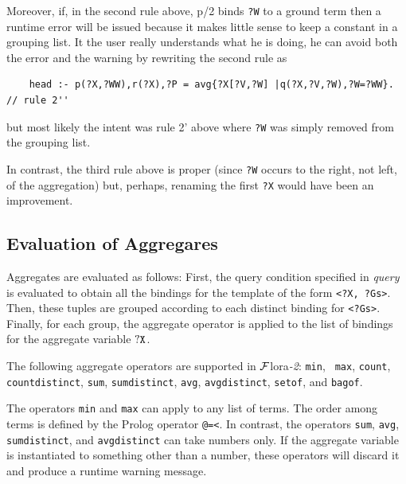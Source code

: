 \documentclass[11pt]{article}
\newcommand{\FLORA}{{\mbox{\sc ${\cal F}${lora}\rm\emph{-2}}}\xspace}
\newcommand{\FLSYSTEM}{\FLORA}
\begin{document}
Moreover, if, in the second rule above, p/2 binds \texttt{?W} to a ground term
then a runtime error will be issued because it makes little sense to
keep a constant in a grouping list. It the user really understands what he
is doing, he can avoid both the error and the warning by rewriting the
second rule as
\begin{verbatim}
    head :- p(?X,?WW),r(?X),?P = avg{?X[?V,?W] |q(?X,?V,?W),?W=?WW}. // rule 2''
\end{verbatim}
but most likely the intent was rule 2' above where \texttt{?W} was simply
removed from the grouping list. 

In contrast, the third rule above is proper (since \texttt{?W} occurs to
the right, not left, of the aggregation)
but, perhaps, renaming the first \texttt{?X} would have been an
improvement.

\subsection{Evaluation of Aggregares}\label{sec-aggr-eval}

Aggregates are evaluated as follows: First, the query
condition specified in {\it query} is evaluated to obtain all the bindings
for the template of the form {\tt \texttt{<}?X, ?Gs\texttt{>}}. Then, these
tuples are grouped according to each distinct binding for
{\tt \texttt{<}?Gs\texttt{>}}. Finally, for each group, the aggregate operator
is applied to the list of bindings for the aggregate variable $\tt ?X$.


%
The following aggregate operators are supported in \FLSYSTEM: {\tt min}, {\tt
  max}, {\tt count}, \texttt{countdistinct},
{\tt sum}, \texttt{sumdistinct},  {\tt avg}, \texttt{avgdistinct},
{\tt setof}, and {\tt bagof}. 

The operators {\tt min} and {\tt max} can apply to any list of
terms. The order among terms is defined by the Prolog operator {\tt @=<}.  In
contrast, the operators {\tt sum}, {\tt avg}, \texttt{sumdistinct}, and
\texttt{avgdistinct} 
can take numbers only. If
the aggregate variable is instantiated to something other than a
number, these operators will discard it and produce a runtime
warning message.
\end{document}
